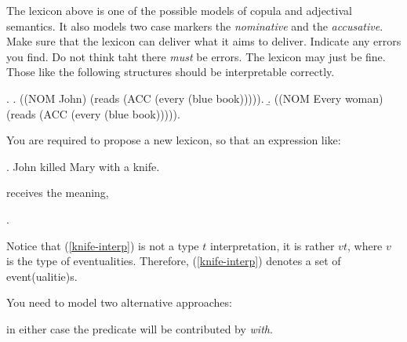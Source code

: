 \documentclass[10pt,a4paper]{exam}
\begin{document}
\begin{questions}

\question[20] The lexicon above is one of the possible models of copula
and adjectival semantics. It also models two case markers the
\emph{nominative} and the \emph{accusative}. Make sure that the
lexicon can deliver what it aims to deliver. Indicate any errors you
find. Do not think taht there \emph{must} be errors. The lexicon may
just be fine. Those like the following structures should be interpretable
correctly.


\ex.
\a. ((NOM John) (reads (ACC (every (blue book))))).
\b. ((NOM Every woman) (reads (ACC (every (blue book))))).


\question

You are required to propose a new lexicon, so that an expression like:


\ex.\label{knife} John killed Mary with a knife.

receives the meaning,


\ex.\label{knife-interp} 


Notice that (\ref{knife-interp}) is not a type $t$ interpretation, it
is rather $vt$, where $v$ is the type of eventualities. Therefore,
(\ref{knife-interp}) denotes a set of event(ualitie)s.


You need to model two alternative approaches:


in either case the predicate  will be contributed by
\emph{with}.

\end{questions}
\end{document}
